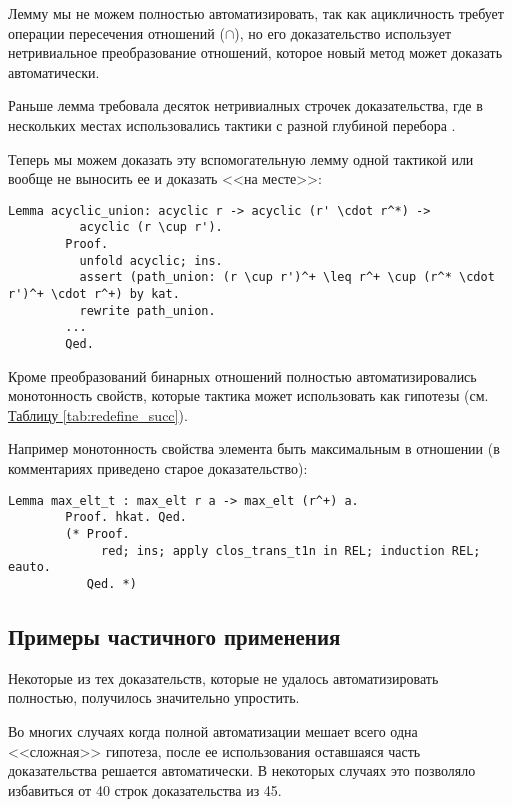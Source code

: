 \documentclass[times
              ,specification
              ,annotation
              ]{itmo-student-thesis}
\begin{document}
      Лемму  мы не можем полностью автоматизировать, так как ацикличность требует операции
      пересечения отношений ($\cap$), но его доказательство использует нетривиальное преобразование
       отношений, которое новый метод может доказать автоматически.

      Раньше лемма  требовала десяток нетривиалных строчек доказательства, где в
      нескольких местах использовались тактики с разной глубиной перебора .

      Теперь мы можем доказать эту вспомогательную лемму одной тактикой или вообще не выносить ее и
      доказать <<на месте>>:

      \begin{lstlisting}[float=false, gobble=8]
        Lemma acyclic_union: acyclic r -> acyclic (r' \cdot r^*) ->
          acyclic (r \cup r').
        Proof.
          unfold acyclic; ins.
          assert (path_union: (r \cup r')^+ \leq r^+ \cup (r^* \cdot r')^+ \cdot r^+) by kat.
          rewrite path_union.
        ...
        Qed.
      \end{lstlisting}

      Кроме преобразований бинарных отношений полностью автоматизировались монотонность свойств,
      которые тактика  может использовать как гипотезы
      (см. \hyperref[tab:redefine_succ]{Таблицу \ref{tab:redefine_succ}}).

      Например монотонность свойства элемента быть максимальным в отношении (в комментариях приведено
      старое доказательство):
      \begin{lstlisting}[float=false, gobble=8]
        Lemma max_elt_t : max_elt r a -> max_elt (r^+) a.
        Proof. hkat. Qed.
        (* Proof.
             red; ins; apply clos_trans_t1n in REL; induction REL; eauto.
           Qed. *)
      \end{lstlisting}

    \subsection{Примеры частичного применения }
      Некоторые из тех доказательств, которые не удалось автоматизировать полностью, получилось
      значительно упростить.

      Во многих случаях когда полной автоматизации мешает всего одна <<сложная>> гипотеза,
      после ее использования оставшаяся часть доказательства решается автоматически. В некоторых
      случаях это позволяло избавиться от 40 строк доказательства из 45.
\end{document}
